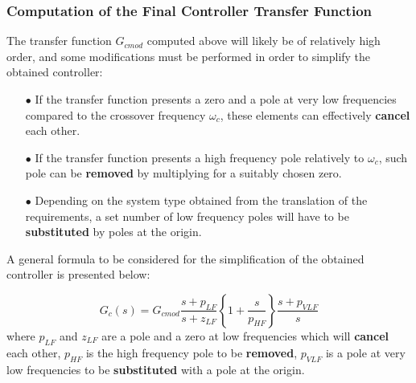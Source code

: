 \documentclass[a4paper,10pt,titlepage]{article}
\numberwithin{equation}{subsection}
\begin{document}
	\subsubsection{Computation of the Final Controller Transfer Function}
	The transfer function $G_{cmod}$ computed above will likely be of relatively high order, and some modifications must be performed in order to simplify the obtained controller:
	
	\begin{enumerate}
		\item[$\bullet$] If the transfer function presents a zero and a pole at very low frequencies compared to the crossover frequency $\omega_c$, these elements can effectively \textbf{cancel} each other.
		\item[$\bullet$] If the transfer function presents a high frequency pole relatively to $\omega_c$, such pole can be \textbf{removed} by multiplying for a suitably chosen zero.
		\item[$\bullet$] Depending on the system type obtained from the translation of the requirements, a set number of low frequency poles will have to be \textbf{substituted} by poles at the origin.
	\end{enumerate}
	A general formula to be considered for the simplification of the obtained controller is presented below:
	
	\begin{equation}
		G_c(s) = G_{cmod} \dfrac{s+p_{LF}}{s+z_{LF}} \left\{ 1+\dfrac{s}{p_{HF}} \right\} \dfrac{s+p_{VLF}}{s} 
	\end{equation}
	where $p_{LF}$ and $z_{LF}$ are a pole and a zero at low frequencies which will \textbf{cancel} each other, $p_{HF}$ is the high frequency pole to be \textbf{removed}, $p_{VLF}$ is a pole at very low frequencies to be \textbf{substituted} with a pole at the origin.
		
\end{document}
